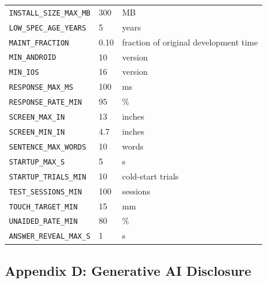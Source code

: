 \documentclass[12pt]{article}
\begin{document}
\begin{longtable}{p{} p{} p{}}
\texttt{INSTALL\_SIZE\_MAX\_MB}
\label{const:INSTALL_SIZE_MAX_MB}
& 300 & MB\\

\texttt{LOW\_SPEC\_AGE\_YEARS}
\label{const:LOW_SPEC_AGE_YEARS}
& 5 & years\\

\texttt{MAINT\_FRACTION}
\label{const:MAINT_FRACTION}
& 0.10 & fraction of original development time\\

\texttt{MIN\_ANDROID}
\label{const:MIN_ANDROID}
& 10 & version\\

\texttt{MIN\_IOS}
\label{const:MIN_IOS}
& 16 & version\\

\texttt{RESPONSE\_MAX\_MS}
\label{const:RESPONSE_MAX_MS}
& 100 & ms\\

\texttt{RESPONSE\_RATE\_MIN}
\label{const:RESPONSE_RATE_MIN}
& 95 & \%\\

\texttt{SCREEN\_MAX\_IN}
\label{const:SCREEN_MAX_IN}
& 13 & inches\\

\texttt{SCREEN\_MIN\_IN}
\label{const:SCREEN_MIN_IN}
& 4.7 & inches\\

\texttt{SENTENCE\_MAX\_WORDS}
\label{const:SENTENCE_MAX_WORDS}
& 10 & words\\

\texttt{STARTUP\_MAX\_S}
\label{const:STARTUP_MAX_S}
& 5 & s\\

\texttt{STARTUP\_TRIALS\_MIN}
\label{const:STARTUP_TRIALS_MIN}
& 10 & cold-start trials\\

\texttt{TEST\_SESSIONS\_MIN}
\label{const:TEST_SESSIONS_MIN}
& 100 & sessions\\

\texttt{TOUCH\_TARGET\_MIN}
\label{const:TOUCH_TARGET_MIN}
& 15 & mm\\

\texttt{UNAIDED\_RATE\_MIN}
\label{const:UNAIDED_RATE_MIN}
& 80 & \%\\

\texttt{ANSWER\_REVEAL\_MAX\_S}
\label{const:ANSWER_REVEAL_MAX_S}
& 1 & s\\

\end{longtable}

\subsection{Appendix D: Generative AI Disclosure}
\end{document}
